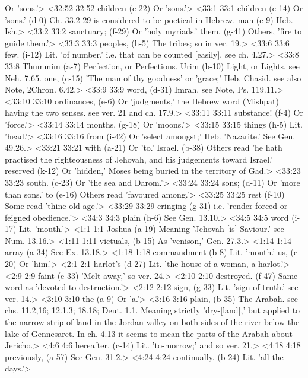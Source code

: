  Or 'sons.'>
<32:52 32:52  children (c-22) Or 'sons.'>
<33:1 33:1  children (c-14)  Or 'sons.'
   (d-0)  Ch. 33.2-29 is considered to be poetical in Hebrew.
  man (e-9)  Heb. Ish.>
<33:2 33:2  sanctuary; (f-29)  Or 'holy myriads.'
  them. (g-41)  Others, 'fire to guide them.'>
<33:3 33:3  peoples, (h-5)  The tribes; so in ver. 19.>
<33:6 33:6  few. (i-12)  Lit. 'of number.' i.e. that can be counted [easily]. see ch. 4.27.>
<33:8 33:8  Thummim (a-7)  Perfection, or Perfections.
  Urim (b-10)  Light, or Lights. see Neh. 7.65.
  one, (c-15)  'The man of thy goodness' or 'grace;' Heb. Chasid. see also  Note, 2Chron. 6.42.>
<33:9 33:9  word, (d-31)  Imrah. see Note, Ps. 119.11.>
<33:10 33:10  ordinances, (e-6)  Or 'judgments,' the Hebrew word (Mishpat) having the two  senses. see ver. 21 and ch. 17.9.>
<33:11 33:11  substance! (f-4)  Or 'force.'>
<33:14 33:14  months, (g-18)  Or 'moons.'>
<33:15 33:15  things (h-5)  Lit. 'head.'>
<33:16 33:16  from (i-42)  Or 'select amongst;' Heb. 'Nazarite.' See Gen. 49.26.>
<33:21 33:21  with (a-21)  Or 'to.'
  Israel. (b-38)  Others read 'he hath practised the righteousness of Jehovah,  and his judgements toward Israel.'
  reserved (k-12)  Or 'hidden,' Moses being buried in the territory of Gad.>
<33:23 33:23  south. (c-23)  Or 'the sea and Darom.'>
<33:24 33:24  sons; (d-11)  Or 'more than sons.'
  to (e-16)  Others read 'favoured among.'>
<33:25 33:25  rest (f-10)  Some read 'thine old age.'>
<33:29 33:29  cringing (g-31)  i.e. 'render forced or feigned obedience.'>
<34:3 34:3  plain (h-6)  See Gen. 13.10.>
<34:5 34:5  word (i-17)  Lit. 'mouth.'>
<1:1 1:1  Joshua (a-19)  Meaning 'Jehovah [is] Saviour.' see Num. 13.16.>
<1:11 1:11  victuals, (b-15)  As 'venison,' Gen. 27.3.>
<1:14 1:14  array (a-34)  See Ex. 13.18.>
<1:18 1:18  commandment (b-8)  Lit. 'mouth.'
  us, (c-20)  Or 'him.'>
<2:1 2:1  harlot's (d-27)  Lit. 'the house of a woman, a harlot.'>
<2:9 2:9  faint (e-33)  'Melt away,' so ver. 24.>
<2:10 2:10  destroyed. (f-47)  Same word as 'devoted to destruction.'>
<2:12 2:12  sign, (g-33)  Lit. 'sign of truth.' see ver. 14.>
<3:10 3:10  the (a-9)  Or 'a.'>
<3:16 3:16  plain, (b-35)  The Arabah. see chs. 11.2,16; 12.1,3; 18.18; Deut. 1.1.  Meaning strictly 'dry-[land],' but applied to the narrow strip  of land in the Jordan valley on both sides of the river below  the lake of Gennesaret. In ch. 4.13 it seems to mean the parts  of the Arabah about Jericho.>
<4:6 4:6  hereafter, (c-14)  Lit. 'to-morrow;' and so ver. 21.>
<4:18 4:18  previously, (a-57)  See Gen. 31.2.>
<4:24 4:24  continually. (b-24)  Lit. 'all the days.'>
